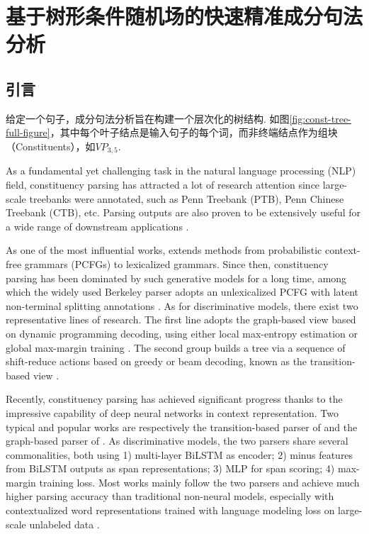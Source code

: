 \chapter{基于树形条件随机场的快速精准成分句法分析}
\label{sec:super_tc}

\section{引言}

给定一个句子，成分句法分析旨在构建一个层次化的树结构. 如图\ref{fig:const-tree-full-figure}，其中每个叶子结点是输入句子的每个词，而非终端结点作为组块（Constituents），如\texttt{$VP_{3,5}$}.

As a fundamental yet challenging task in the natural language processing (NLP) field, constituency parsing has attracted a lot of research attention since large-scale treebanks were annotated,  such as Penn Treebank (PTB), Penn Chinese Treebank (CTB), etc.
Parsing outputs are also proven to be extensively useful for a wide range of downstream applications \cite{akoury-etal-2019-syntactically,wang-etal-2018-tree}.

As one of the most influential works, \cite{collins-1997-three} extends methods from probabilistic context-free grammars (PCFGs) to lexicalized grammars.
Since then, constituency parsing has been dominated by such generative models for a long time, among which
the widely used Berkeley parser adopts an unlexicalized PCFG with latent non-terminal splitting annotations \cite{matsuzaki-etal-2005-probabilistic,petrov-klein-2007-improved}.
As for discriminative models, there exist two representative lines of research.
The first line adopts the graph-based view based on dynamic programming decoding, using either local max-entropy estimation \cite{kaplan-etal-2004-speed} or global max-margin training \cite{taskar-etal-2004-max}.
The second group builds a tree via a sequence of shift-reduce actions based on greedy or beam decoding, known as the transition-based view \cite{sagae-lavie-2005-classifier,zhu-etal-2013-fast}.




Recently, constituency parsing has achieved significant progress thanks to the impressive capability of deep neural networks in context representation.
Two typical and popular works are respectively the transition-based parser of \cite{cross-huang-2016-span} and the graph-based parser of \cite{stern-etal-2017-minimal}.
As discriminative models, the two parsers share several commonalities, both using 1) multi-layer BiLSTM as encoder; 2) minus features from BiLSTM outputs as span representations; 3) MLP for span scoring; 4) max-margin training loss.
Most works \cite{gaddy-etal-2018-whats,kitaev-klein-2018-constituency} mainly follow the two parsers and achieve much higher parsing accuracy than traditional non-neural models, especially with contextualized word representations trained with language modeling loss on large-scale unlabeled data \cite{peters-etal-2018-deep,devlin-etal-2019-bert}.

